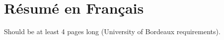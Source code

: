 \chapter*{R\'{e}sum\'{e} en Français}

Should be at least 4 pages long (University of Bordeaux requirements).

\lipsum[1-20]
